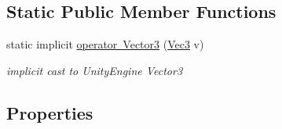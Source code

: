 \subsection*{Static Public Member Functions}
\begin{DoxyCompactItemize}
\item 
static implicit \mbox{\hyperlink{class_virt_muse_web_1_1_utility_1_1_vec3_af34a58052ccc174dce6803eeabaa9647}{operator Vector3}} (\mbox{\hyperlink{class_virt_muse_web_1_1_utility_1_1_vec3}{Vec3}} v)
\begin{DoxyCompactList}\small\item\em implicit cast to Unity\+Engine Vector3 \end{DoxyCompactList}\end{DoxyCompactItemize}
\subsection*{Properties}
